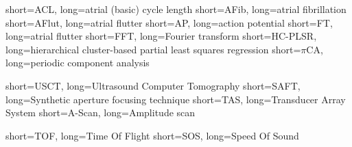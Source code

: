 


\usepackage{enumitem}
\newlength\myitemwidth

\setlength\myitemwidth{9em} 						%






  		{short={ACL},		long={atrial (basic) cycle length}}
  		{short={AFib},		long={atrial fibrillation}}
  		{short={AFlut},		long={atrial flutter}}
  		{short={AP},			long={action potential}}
  		{short={FT},			long={atrial flutter}}
  		{short={FFT},		long={Fourier transform}}
  	{short={HC-PLSR},	long={hierarchical cluster-based partial least squares regression}}
  		{short={$\pi$CA},	long={periodic component analysis}}
  
		{short={USCT},	long={Ultrasound Computer Tomography}}
		{short={SAFT},	long={Synthetic aperture focusing technique}}
		{short={TAS},	long={Transducer Array System}}
		{short={A-Scan},	long={Amplitude scan}}

		{short={TOF},	long={Time Of Flight}}
		{short={SOS},	long={Speed Of Sound}}
